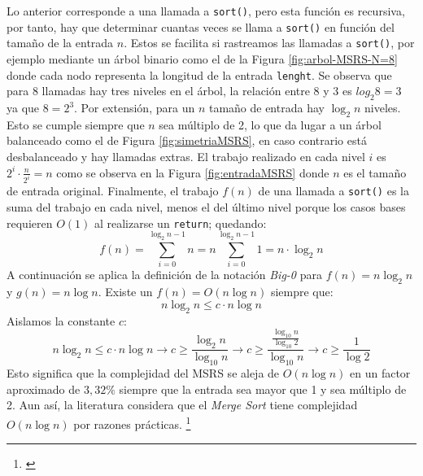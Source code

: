\documentclass[titlepage]{article}
\begin{document}
Lo anterior corresponde a una llamada a \lstinline|sort()|, pero esta función es recursiva, por tanto, hay que determinar cuantas veces se llama a \lstinline|sort()| en función del tamaño de la entrada \(n\). Estos se facilita si rastreamos las llamadas a \lstinline|sort()|, por ejemplo mediante un árbol binario como el de la Figura \ref{fig:arbol-MSRS-N=8} donde cada nodo representa la longitud de la entrada \lstinline|lenght|. Se observa que para 8 llamadas hay tres niveles en el árbol, la relación entre 8 y 3 es \(log_{2}{8} = 3\) ya que \(8=2^3\). Por extensión, para un \(n\) tamaño de entrada hay \(\log_{2}{n}\) niveles. Esto se cumple siempre que \(n\) sea múltiplo de 2, lo que da lugar a un árbol balanceado como el de Figura \ref{fig:simetriaMSRS}, en caso contrario está desbalanceado y hay llamadas extras. El trabajo realizado en cada nivel \(i\) es \(2^i\cdot \frac{n}{2^i} = n\) como se observa en la Figura \ref{fig:entradaMSRS} donde \(n\) es el tamaño de entrada original. Finalmente, el trabajo \(f(n)\) de una llamada a \lstinline|sort()| es la suma del trabajo en cada nivel, menos el del último nivel porque los casos bases requieren \(O(1)\) al realizarse un \lstinline|return|; quedando:
\[f(n) = \sum_{i=0}^{\log_{2}{n} -1} {n} = n\sum_{i=0}^{\log_{2}{n} -1} {1} = n\cdot\log_{2}{n}\]
A continuación se aplica la definición de la notación \textit{Big-0} para \(f(n)=n\log_{2}{n}\) y \(g(n)=n\log{n}\). Existe un \(f(n)=O(n\log{n})\) siempre que: 
\[n\log_{2}{n} \leq c\cdot n\log{n}\]
Aislamos la constante \(c\):
\[n\log_{2}{n} \leq c\cdot n\log{n} \longrightarrow c \geq \frac{\log_{2}{n}} {\log_{10}{n}} \longrightarrow c \geq \frac{ \frac{\log_{10}{n}} {\log_{10}{2}} } {\log_{10}{n}} \longrightarrow c \geq \frac{1}{\log{2}} \]
Esto significa que la complejidad del MSRS se aleja de \(O(n\log{n})\) en un factor aproximado de \(3,32\%\) siempre que la entrada sea mayor que 1 y sea múltiplo de 2. Aun así, la literatura considera que el \textit{Merge Sort} tiene complejidad \(O(n\log{n})\) por razones prácticas. \footnote{\cite{Sedgewick2003-cd}}
\end{document}

